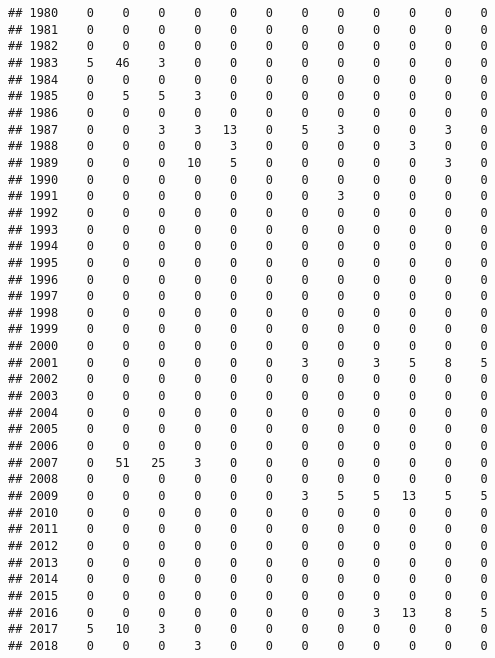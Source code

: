\documentclass[]{article}
\begin{document}
\begin{verbatim}
## 1980    0    0    0    0    0    0    0    0    0    0    0    0
## 1981    0    0    0    0    0    0    0    0    0    0    0    0
## 1982    0    0    0    0    0    0    0    0    0    0    0    0
## 1983    5   46    3    0    0    0    0    0    0    0    0    0
## 1984    0    0    0    0    0    0    0    0    0    0    0    0
## 1985    0    5    5    3    0    0    0    0    0    0    0    0
## 1986    0    0    0    0    0    0    0    0    0    0    0    0
## 1987    0    0    3    3   13    0    5    3    0    0    3    0
## 1988    0    0    0    0    3    0    0    0    0    3    0    0
## 1989    0    0    0   10    5    0    0    0    0    0    3    0
## 1990    0    0    0    0    0    0    0    0    0    0    0    0
## 1991    0    0    0    0    0    0    0    3    0    0    0    0
## 1992    0    0    0    0    0    0    0    0    0    0    0    0
## 1993    0    0    0    0    0    0    0    0    0    0    0    0
## 1994    0    0    0    0    0    0    0    0    0    0    0    0
## 1995    0    0    0    0    0    0    0    0    0    0    0    0
## 1996    0    0    0    0    0    0    0    0    0    0    0    0
## 1997    0    0    0    0    0    0    0    0    0    0    0    0
## 1998    0    0    0    0    0    0    0    0    0    0    0    0
## 1999    0    0    0    0    0    0    0    0    0    0    0    0
## 2000    0    0    0    0    0    0    0    0    0    0    0    0
## 2001    0    0    0    0    0    0    3    0    3    5    8    5
## 2002    0    0    0    0    0    0    0    0    0    0    0    0
## 2003    0    0    0    0    0    0    0    0    0    0    0    0
## 2004    0    0    0    0    0    0    0    0    0    0    0    0
## 2005    0    0    0    0    0    0    0    0    0    0    0    0
## 2006    0    0    0    0    0    0    0    0    0    0    0    0
## 2007    0   51   25    3    0    0    0    0    0    0    0    0
## 2008    0    0    0    0    0    0    0    0    0    0    0    0
## 2009    0    0    0    0    0    0    3    5    5   13    5    5
## 2010    0    0    0    0    0    0    0    0    0    0    0    0
## 2011    0    0    0    0    0    0    0    0    0    0    0    0
## 2012    0    0    0    0    0    0    0    0    0    0    0    0
## 2013    0    0    0    0    0    0    0    0    0    0    0    0
## 2014    0    0    0    0    0    0    0    0    0    0    0    0
## 2015    0    0    0    0    0    0    0    0    0    0    0    0
## 2016    0    0    0    0    0    0    0    0    3   13    8    5
## 2017    5   10    3    0    0    0    0    0    0    0    0    0
## 2018    0    0    0    3    0    0    0    0    0    0    0    0

\end{verbatim}
\end{document}
